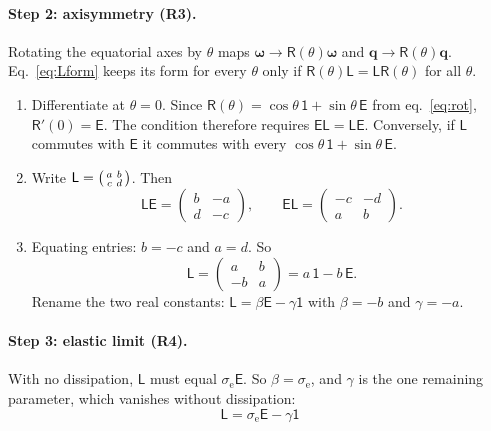 \documentclass[11pt,a4paper]{article}
\newcommand{\bw}{\bm{\omega}}
\newcommand{\bq}{\mathbf{q}}
\newcommand{\E}{\mathsf{E}}
\newcommand{\Id}{\mathsf{1}}
\newcommand{\se}{\sigma_{\mathrm e}}
\begin{document}
\paragraph{Step 2: axisymmetry (R3).} Rotating the equatorial axes by $\theta$ maps $\bw\to\mathsf{R}(\theta)\bw$
and $\bq\to\mathsf{R}(\theta)\bq$. Eq.~\eqref{eq:Lform} keeps its form for every $\theta$ only if
$\mathsf{R}(\theta)\mathsf{L}=\mathsf{L}\mathsf{R}(\theta)$ for all $\theta$.
\begin{enumerate}
  \item Differentiate at $\theta=0$. Since $\mathsf{R}(\theta)=\cos\theta\,\Id+\sin\theta\,\E$ from
  eq.~\eqref{eq:rot}, $\mathsf{R}'(0)=\E$. The condition therefore requires $\E\mathsf{L}=\mathsf{L}\E$.
  Conversely, if $\mathsf{L}$ commutes with $\E$ it commutes with every $\cos\theta\,\Id+\sin\theta\,\E$.
  \item Write $\mathsf{L}=\begin{psmallmatrix}a&b\\c&d\end{psmallmatrix}$. Then
  \begin{equation}
    \mathsf{L}\E=\begin{pmatrix}b&-a\\d&-c\end{pmatrix},\qquad
    \E\mathsf{L}=\begin{pmatrix}-c&-d\\a&b\end{pmatrix}.
  \end{equation}
  \item Equating entries: $b=-c$ and $a=d$. So
  \begin{equation}
    \mathsf{L}=\begin{pmatrix}a&b\\-b&a\end{pmatrix}=a\,\Id-b\,\E .
  \end{equation}
  Rename the two real constants: $\mathsf{L}=\beta\E-\gamma\Id$ with $\beta=-b$ and $\gamma=-a$.
\end{enumerate}

\paragraph{Step 3: elastic limit (R4).} With no dissipation, $\mathsf{L}$ must equal $\se\E$. So
$\beta=\se$, and $\gamma$ is the one remaining parameter, which vanishes without dissipation:
\begin{equation}
  \boxed{\;\mathsf{L}=\se\E-\gamma\Id\;}
\end{equation}
\end{document}
